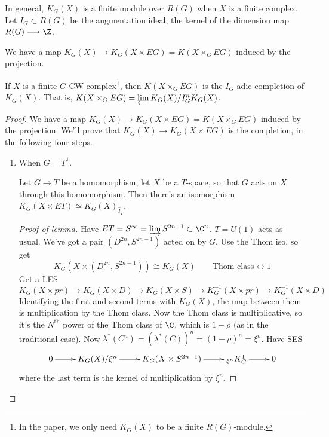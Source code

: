 \documentclass[11pt]{article}
\begin{document}
\begin{GuozhenEqKthy}
In general, $K_G(X)$ is a finite module over $R(G)$ when $X$ is a finite complex. %
Let $I_G\subset R(G)$ be the augmentation ideal, the kernel of the dimension map $R(G)\to\Z$.

We have a map $K_G(X)\to K_G(X\times EG)=K(X\times_G EG)$ induced by the projection.
\begin{thm*}
If $X$ is a finite $G$-CW-complex\footnote{In the paper, we only need $K_G(X)$ to be a finite $R(G)$-module.},
then $K(X\times_G EG)$ is the $I_G$-adic completion of $K_G(X)$. That is, $K(X\times_G EG)=\varprojlim K_G(X)/I_G^nK_G(X)$.
\end{thm*}
\begin{proof}
We have a map $K_G(X)\to K_G(X\times EG)=K(X\times_G EG)$ induced by the projection.
We'll prove that $K_G(X)\to K_G(X\times EG)$ is the completion, in the following four steps.
\begin{enumerate}
\item When $G=T^1$.
\begin{lem*}
Let $G\to T$ be a homomorphism, let $X$ be a $T$-space, so that $G$ acts on $X$ through this homomorphism. Then there's an isomorphism $K_G(X\times ET)\simeq K_G(X)_{\hat I_{T}}$.
\end{lem*}
\begin{proof}[Proof of lemma]
Have $ET=S^\infty=\varinjlim S^{2n-1}\subset \C^n$. $T=U(1)$ acts as usual. We've got a pair $(D^{2n},S^{2n-1})$ acted on by $G$.
 Use the Thom iso, so get
\[K_G(X\times(D^{2n},S^{2n-1}))\cong K_G(X)\qquad    \text{Thom class}\longleftrightarrow 1\]
Get a LES
\[K_G(X\times pr)\to K_G(X\times D)\to K_G(X\times S)\to K_G^{-1}(X\times pr)\to K_G^{-1}(X\times D)\]
Identifying the first and second terms with $K_G(X)$, the map between them is multiplication by the Thom class. Now the Thom class is multiplicative, so it's the $N^\text{th}$ power of the Thom class of $\C$, which is $1-\rho$ (as in the traditional case).
Now $\lambda^*(C^n)=(\lambda^*(C))^n =(1-\rho)^n=\xi^n$. Have SES
\[\xymatrix{
0\ar[r] &K_G(X)/\xi^n\ar[r] &K_G(X\times S^{2n-1})\ar[r]& {_{\xi^n}K_G^1}\ar[r]&0
}\]
where the last term is the kernel of multiplication by $\xi^n$.


\end{proof}
\end{enumerate}
\end{proof}
\end{GuozhenEqKthy}
\end{document}
